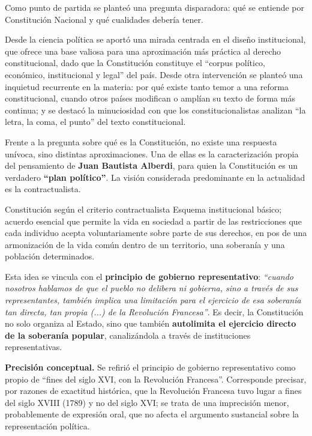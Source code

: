 \documentclass[12pt,oneside]{book}
\begin{document}
Como punto de partida se planteó una pregunta disparadora: qué se entiende por Constitución Nacional y qué cualidades debería tener.

Desde la ciencia política se aportó una mirada centrada en el diseño institucional, que ofrece una base valiosa para una aproximación más práctica al derecho constitucional, dado que la Constitución constituye el ``corpus político, económico, institucional y legal'' del país. Desde otra intervención se planteó una inquietud recurrente en la materia: por qué existe tanto temor a una reforma constitucional, cuando otros países modifican o amplían su texto de forma más continua; y se destacó la minuciosidad con que los constitucionalistas analizan ``la letra, la coma, el punto'' del texto constitucional.

Frente a la pregunta sobre qué es la Constitución, no existe una respuesta unívoca, sino distintas aproximaciones. Una de ellas es la caracterización propia del pensamiento de \textbf{Juan Bautista Alberdi}, para quien la Constitución es un verdadero \textbf{``plan político''}. La visión considerada predominante en la actualidad es la contractualista.

\begin{definition}{Constitución según el criterio contractualista}
Esquema institucional básico; acuerdo esencial que permite la vida en sociedad a partir de las restricciones que cada individuo acepta voluntariamente sobre parte de sus derechos, en pos de una armonización de la vida común dentro de un territorio, una soberanía y una población determinados.
\end{definition}

Esta idea se vincula con el \textbf{principio de gobierno representativo}: \textit{``cuando nosotros hablamos de que el pueblo no delibera ni gobierna, sino a través de sus representantes, también implica una limitación para el ejercicio de esa soberanía tan directa, tan propia (...) de la Revolución Francesa''}. Es decir, la Constitución no solo organiza al Estado, sino que también \textbf{autolimita el ejercicio directo de la soberanía popular}, canalizándola a través de instituciones representativas.

\begin{note}
\textbf{Precisión conceptual.} Se refirió el principio de gobierno representativo como propio de ``fines del siglo XVI, con la Revolución Francesa''. Corresponde precisar, por razones de exactitud histórica, que la Revolución Francesa tuvo lugar a fines del siglo XVIII (1789) y no del siglo XVI; se trata de una imprecisión menor, probablemente de expresión oral, que no afecta el argumento sustancial sobre la representación política.
\end{note}
\end{document}
